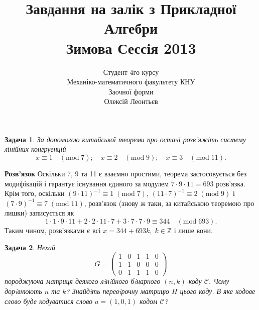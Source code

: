 \documentclass[12pt]{article} %
\title{Завдання на залік з Прикладної Алгебри\\Зимова Сессія 2013}
\author{Студент 4го курсу\\Механіко-математичного факультету КНУ\\Заочної форми\\Олексій Леонтьєв}
\newtheorem{problem}{Задача}
\newenvironment{solution}%
{\par\textbf{Розв'язок}\space }%
{\par}
\newcommand{\mymod}{\mathrm{mod}\;}
\begin{document}
\maketitle
\begin{problem}
	За допомогою китайської теореми про остачі розв’яжіть систему лінійних конгруенцій
	\[x\equiv 1\quad(\mymod 7);\quad x\equiv 2\quad(\mymod 9);\quad x\equiv 3\quad(\mymod 11).\]
\end{problem}
\begin{solution}
	Оскільки 7, 9 та 11 є взаємно простими, теорема застосовується без модифікацій і гарантує існування єдиного за модулем $7\cdot 9\cdot 11=
	693$ розв’язка. Крім того, оскільки ${(9\cdot 11)}^{-1}\equiv 1\;(\mymod 7)$,
	${(11\cdot7)}^{-1}\equiv 2\;(\mymod 9)$ і ${(7\cdot 9)}^{-1}\equiv 7\;(\mymod 11)$, розв’язок (знову ж таки, за китайською
	теоремою про лишки) записується як
	\[1\cdot1\cdot 9\cdot 11+2\cdot 2\cdot 11\cdot 7+3\cdot 7\cdot 7\cdot 9\equiv 344\quad(\mymod 693).\]
	Таким чином, розв’язками є всі $x=344+693k,\;k\in\mathbb{Z}$ і лише вони.
\end{solution}
\begin{problem}
Нехай
\[G =\begin{pmatrix}
1 & 0 & 1 & 1 & 0\\
1 & 1 & 0 & 0 & 0\\
0 & 1 & 1 & 1 & 0\end{pmatrix}
\]
породжуюча матриця деякого лiнiйного бiнарного $(n, k)$-коду $\mathcal{C}$. Чому дорiвнюють $n$
та $k$? Знайдiть перевiрочну матрицю $H$ цього коду. В яке кодове слово буде кодуватися слово $a = (1, 0, 1)$ кодом $\mathcal{C}$?
\end{problem}
\end{document}
